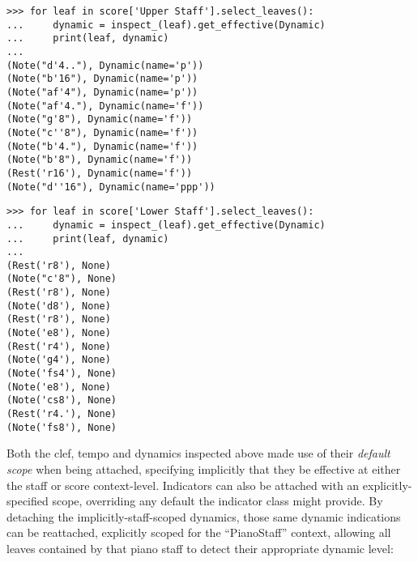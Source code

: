 \begin{comment}
<abjad>
for leaf in score['Upper Staff'].select_leaves():
    dynamic = inspect_(leaf).get_effective(Dynamic)
    print(leaf, dynamic)

for leaf in score['Lower Staff'].select_leaves():
    dynamic = inspect_(leaf).get_effective(Dynamic)
    print(leaf, dynamic)

</abjad>
\end{comment}

\begin{abjadbookoutput}
\begin{singlespacing}
\vspace{-0.5\baselineskip}
\begin{lstlisting}
>>> for leaf in score['Upper Staff'].select_leaves():
...     dynamic = inspect_(leaf).get_effective(Dynamic)
...     print(leaf, dynamic)
...
(Note("d'4.."), Dynamic(name='p'))
(Note("b'16"), Dynamic(name='p'))
(Note("af'4"), Dynamic(name='p'))
(Note("af'4."), Dynamic(name='f'))
(Note("g'8"), Dynamic(name='f'))
(Note("c''8"), Dynamic(name='f'))
(Note("b'4."), Dynamic(name='f'))
(Note("b'8"), Dynamic(name='f'))
(Rest('r16'), Dynamic(name='f'))
(Note("d''16"), Dynamic(name='ppp'))
\end{lstlisting}
\begin{lstlisting}
>>> for leaf in score['Lower Staff'].select_leaves():
...     dynamic = inspect_(leaf).get_effective(Dynamic)
...     print(leaf, dynamic)
...
(Rest('r8'), None)
(Note("c'8"), None)
(Rest('r8'), None)
(Note('d8'), None)
(Rest('r8'), None)
(Note('e8'), None)
(Rest('r4'), None)
(Note('g4'), None)
(Note('fs4'), None)
(Note('e8'), None)
(Note('cs8'), None)
(Rest('r4.'), None)
(Note('fs8'), None)
\end{lstlisting}
\end{singlespacing}
\end{abjadbookoutput}

\noindent Both the clef, tempo and dynamics inspected above made use of their
\emph{default scope} when being attached, specifying implicitly that they be
effective at either the staff or score context-level. Indicators can also be
attached with an explicitly-specified scope, overriding any default the
indicator class might provide. By detaching the
implicitly-staff-scoped dynamics, those same dynamic indications can be
reattached, explicitly scoped for the \enquote{PianoStaff} context, allowing
all leaves contained by that piano staff to detect their appropriate dynamic
level:

\begin{comment}
<abjad>
piano_dynamic = detach(Dynamic, score['Voice 1'][0][0])[0]
forte_dynamic = detach(Dynamic, score['Voice 1'][1][0])[0]
attach(piano_dynamic, score['Voice 1'][0][0], scope='PianoStaff')
attach(forte_dynamic, score['Voice 1'][1][0], scope='PianoStaff')
for leaf in score['Upper Staff'].select_leaves():
    dynamic = inspect_(leaf).get_effective(Dynamic)
    print(leaf, dynamic)

for leaf in score['Lower Staff'].select_leaves():
    dynamic = inspect_(leaf).get_effective(Dynamic)
    print(leaf, dynamic)

</abjad>
\end{comment}

